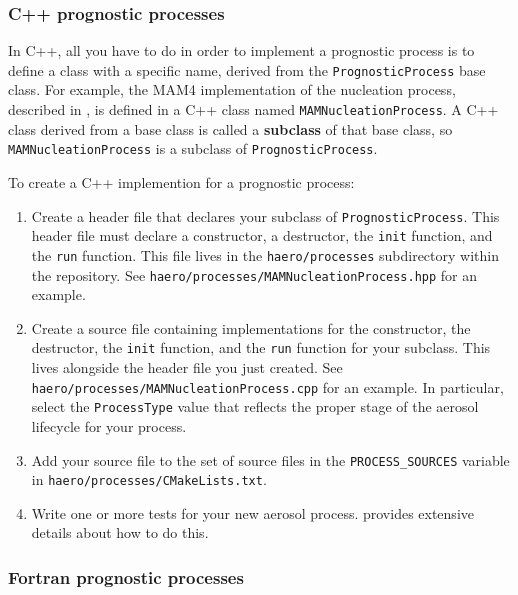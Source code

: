 \subsubsection{C++ prognostic processes}

In C++, all you have to do in order to implement a prognostic process is to
define a class with a specific name, derived from the
\texttt{PrognosticProcess} base class. For example, the MAM4 implementation of the
nucleation process, described in , is defined in a C++
class named \texttt{MAMNucleationProcess}. A C++ class derived from a base class
is called a {\bf subclass} of that base class, so
\texttt{MAMNucleationProcess} is a subclass of \texttt{PrognosticProcess}.

To create a C++ implemention for a prognostic process:

\begin{enumerate}
  \item Create a header file that declares your subclass of
        \texttt{PrognosticProcess}. This header file must declare a constructor,
        a destructor, the \texttt{init} function, and the \texttt{run} function.
        This file lives in the \texttt{haero/processes} subdirectory within the
        repository. See \texttt{haero/processes/MAMNucleationProcess.hpp} for an
        example.
  \item Create a source file containing implementations for the constructor, the
        destructor, the \texttt{init} function, and the \texttt{run} function for
        your subclass. This lives alongside the header file you just created.
        See \texttt{haero/processes/MAMNucleationProcess.cpp} for an example.
        In particular, select the \texttt{ProcessType} value that reflects the
        proper stage of the aerosol lifecycle for your process.
  \item Add your source file to the set of source files in the
        \texttt{PROCESS\_SOURCES} variable in \texttt{haero/processes/CMakeLists.txt}.
  \item Write one or more tests for your new aerosol process.
         provides extensive details about how to do this.
\end{enumerate}

\subsubsection{Fortran prognostic processes}

